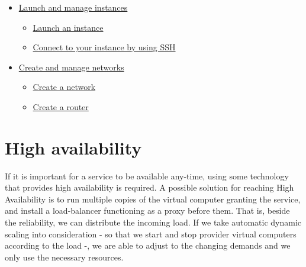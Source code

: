 \documentclass[a4paper]{article}
\begin{document}
\begin{itemize}
\begin{itemize}
{                        a key pair}
              \item
                    \href{https://docs.openstack.org/horizon/pike/user/configure-access-and-security-for-instances.html#import-a-key-pair}{
                        Import a key pair}
              \item
                    \href{https://docs.openstack.org/horizon/pike/user/configure-access-and-security-for-instances.html#allocate-a-floating-ip-address-to-an-instance}{Allocate a floating IP address to an instance}
          \end{itemize}
    \item \href{https://docs.openstack.org/horizon/pike/user/launch-instances.html}{Launch and manage instances}
          \begin{itemize}
              \item \href{https://docs.openstack.org/horizon/pike/user/launch-instances.html#launch-an-instance}{Launch an instance}
              \item
                    \href{https://docs.openstack.org/horizon/pike/user/launch-instances.html#connect-to-your-instance-by-using-ssh}{Connect
                        to your instance by using SSH}
          \end{itemize}
    \item \href{https://docs.openstack.org/horizon/pike/user/create-networks.html}{Create and manage networks}
          \begin{itemize}
              \item \href{https://docs.openstack.org/horizon/pike/user/create-networks.html#create-a-network}{Create a network}
              \item \href{https://docs.openstack.org/horizon/pike/user/create-networks.html#create-a-router}{Create a router}
          \end{itemize}
\end{itemize}

\section{High availability}

If it is important for a service to be available any-time, using some technology that provides high availability is
required. A possible solution for reaching High Availability is to run multiple copies of the virtual computer granting
the service, and install a load-balancer functioning as a proxy before them. That is, beside the reliability, we can
distribute the incoming load. If we take automatic dynamic scaling into consideration - so that we start and stop
provider virtual computers according to the load -, we are able to adjust to the changing demands and we only use the
necessary resources.
\end{document}
